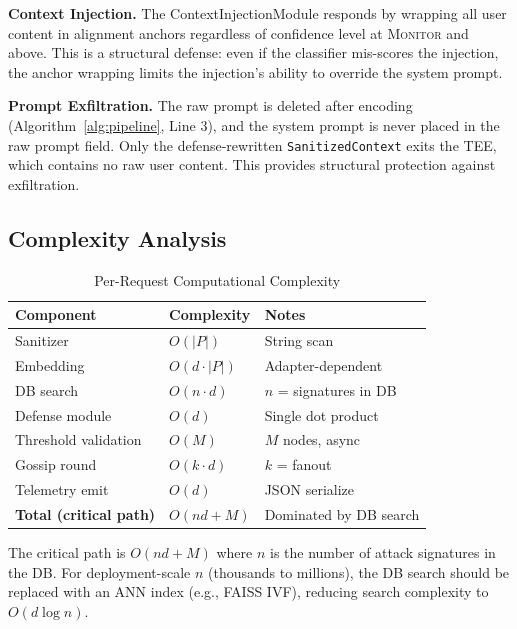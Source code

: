 \documentclass[sigconf,natbib=false]{acmart}
\begin{document}
\textbf{Context Injection.}
The ContextInjectionModule responds by wrapping all user content in
alignment anchors regardless of confidence level at \textsc{Monitor}
and above. This is a structural defense: even if the classifier
mis-scores the injection, the anchor wrapping limits the injection's
ability to override the system prompt.

\textbf{Prompt Exfiltration.}
The raw prompt is deleted after encoding (Algorithm~\ref{alg:pipeline},
Line 3), and the system prompt is never placed in the raw prompt field.
Only the defense-rewritten \texttt{SanitizedContext} exits the TEE,
which contains no raw user content. This provides structural protection
against exfiltration.

\subsection{Complexity Analysis}
\label{sec:security:complexity}

\begin{table}[t]
\centering
\caption{Per-Request Computational Complexity}
\label{tab:complexity}
\small
\begin{tabular}{lll}
\toprule
\textbf{Component} & \textbf{Complexity} & \textbf{Notes} \\
\midrule
Sanitizer & $O(|P|)$ & String scan \\
Embedding & $O(d \cdot |P|)$ & Adapter-dependent \\
DB search & $O(n \cdot d)$ & $n$ = signatures in DB \\
Defense module & $O(d)$ & Single dot product \\
Threshold validation & $O(M)$ & $M$ nodes, async \\
Gossip round & $O(k \cdot d)$ & $k$ = fanout \\
Telemetry emit & $O(d)$ & JSON serialize \\
\midrule
\textbf{Total (critical path)} & $O(nd + M)$ & Dominated by DB search \\
\bottomrule
\end{tabular}
\end{table}

The critical path is $O(nd + M)$ where $n$ is the number of attack
signatures in the DB. For deployment-scale $n$ (thousands to millions),
the DB search should be replaced with an ANN index (e.g., FAISS IVF),
reducing search complexity to $O(d \log n)$.

\end{document}
